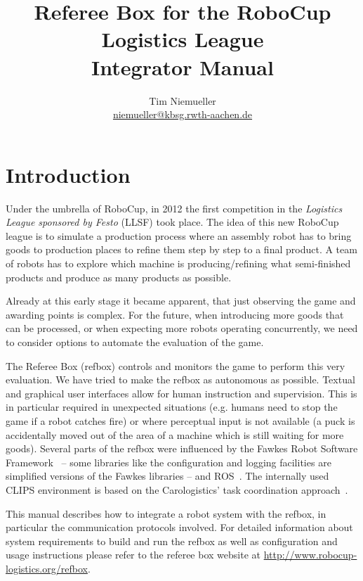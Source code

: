 \documentclass[a4paper]{article}
\begin{document}
\title{\textbf{Referee Box for the RoboCup Logistics League}\\%
  \Large Integrator Manual}
\author{Tim Niemueller\\\href{mailto:niemueller@cs.rwth-aachen.de}{niemueller@kbsg.rwth-aachen.de}}
\maketitle

\section{Introduction}
\label{sec:intro}
Under the umbrella of RoboCup, in 2012 the first competition in the
\textit{Logistics League sponsored by Festo} (LLSF) took place. The
idea of this new RoboCup league is to simulate a production process
where an assembly robot has to bring goods to production places to
refine them step by step to a final product. A team of robots has to
explore which machine is producing/refining what semi-finished
products and produce as many products as possible.

Already at this early stage it became apparent, that just observing
the game and awarding points is complex. For the future, when
introducing more goods that can be processed, or when expecting more
robots operating concurrently, we need to consider options to automate
the evaluation of the game.

The Referee Box (refbox) controls and monitors the game to perform
this very evaluation. We have tried to make the refbox as autonomous
as possible. Textual and graphical user interfaces allow for human
instruction and supervision. This is in particular required in
unexpected situations (e.g. humans need to stop the game if a robot
catches fire) or where perceptual input is not available (a puck is
accidentally moved out of the area of a machine which is still waiting
for more goods). Several parts of the refbox were influenced by the
Fawkes Robot Software Framework~\cite{Fawkes} -- some libraries like
the configuration and logging facilities are simplified versions of
the Fawkes libraries -- and ROS~\cite{ROS}. The internally used CLIPS
environment is based on the Carologistics' task coordination
approach~\cite{CLIPS-Agent}.

This manual describes how to integrate a robot system with the refbox,
in particular the communication protocols involved. For detailed
information about system requirements to build and run the refbox as
well as configuration and usage instructions please refer to the
referee box website at \url{http://www.robocup-logistics.org/refbox}.
\end{document}
